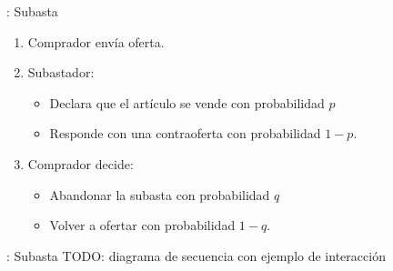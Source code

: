 %
%
%

\begin{frame}{\insertsection: Subasta}
	\begin{enumerate}
		\item Comprador envía oferta.
		\item Subastador:
			\begin{itemize}
				\item Declara que el
			artículo se vende con probabilidad $p$
				\item Responde con una contraoferta con probabilidad $1-p$.
			\end{itemize}
		\item Comprador decide:
			\begin{itemize}
				\item Abandonar la subasta con probabilidad $q$
				\item Volver a ofertar con probabilidad $1-q$.
			\end{itemize}
	\end{enumerate}
\end{frame}

\begin{frame}{\insertsection: Subasta}
	TODO: diagrama de secuencia con ejemplo de interacción
\end{frame}

